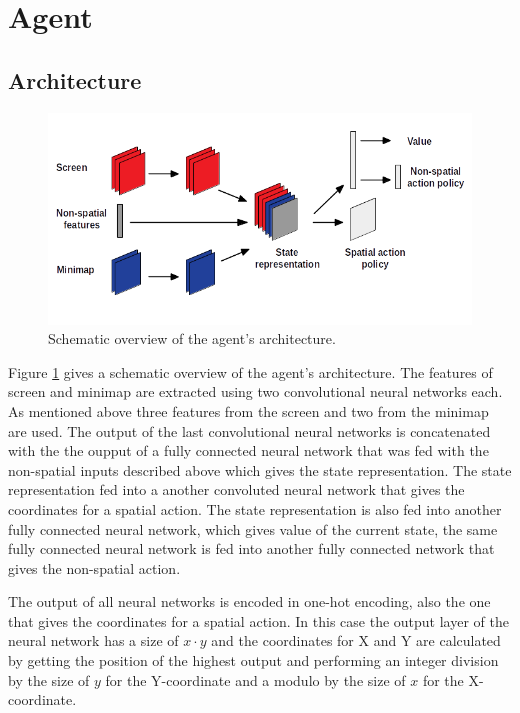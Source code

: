 \documentclass{article}
\begin{document}
\section{Agent}
\subsection{Architecture}
\begin{figure}
\includegraphics[width=\textwidth]{schema}
\caption{Schematic overview of the agent's architecture.}
\label{schema}
\end{figure}

Figure \ref{schema} gives a schematic overview of the agent's architecture. The 
features of screen and minimap are extracted using two convolutional neural 
networks each. As mentioned above three features from the screen and two from 
the minimap are used. The output of the last convolutional neural networks is 
concatenated with the the oupput of a fully connected neural network that was 
fed with the non-spatial inputs described above which gives the state 
representation. The state representation fed into a another convoluted neural 
network that gives the coordinates for a spatial action. The state 
representation is also fed into another fully connected neural network, which 
gives value of the current state, the same fully connected neural network is 
fed into another fully connected network that gives the non-spatial action.

The output of all neural networks is encoded in one-hot encoding, also the one 
that gives the coordinates for a spatial action. In this case the output layer 
of the neural network has a size of $x \cdot y$ and the coordinates for X and 
Y are calculated by getting the position of the highest output and performing 
an integer division by the size of $y$ for the Y-coordinate and a modulo by the 
size of $x$ for the X-coordinate.
\end{document}
